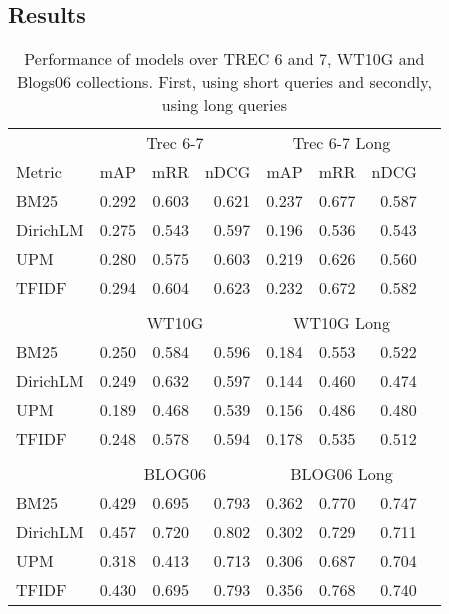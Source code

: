 \subsection{Results}
\begin{table}[h]
  \centering
\begin{tabular*}{\textwidth}{l @{\extracolsep{\fill}}lrrrrrr}
\toprule
& \multicolumn{3}{c}{Trec 6-7} &  \multicolumn{3}{c}{Trec 6-7 Long}\\
\cmidrule(r){2-4}
\cmidrule(r){5-7}
Metric                    & mAP    & mRR    & nDCG  & mAP    & mRR   & nDCG \\
\midrule
BM25		          		 & 0.292  & 0.603  & 0.621  & 0.237  & 0.677  & 0.587 \\
DirichLM                  & 0.275  & 0.543  & 0.597  & 0.196  & 0.536  & 0.543 \\
UPM                       & 0.280  & 0.575  & 0.603  & 0.219  & 0.626  & 0.560 \\
TFIDF                     & 0.294  & 0.604  & 0.623  & 0.232  & 0.672  & 0.582 \\
\\
& \multicolumn{3}{c}{WT10G} &  \multicolumn{3}{c}{WT10G Long}\\
 \cmidrule(r){2-4} \cmidrule(r){5-7}
BM25		          		 & 0.250  & 0.584  & 0.596  & 0.184  & 0.553 & 0.522 \\
DirichLM                  & 0.249  & 0.632  & 0.597  & 0.144  & 0.460 & 0.474 \\
UPM                       & 0.189  & 0.468  & 0.539  & 0.156  & 0.486 & 0.480 \\
TFIDF                     & 0.248  & 0.578  & 0.594  & 0.178  & 0.535 & 0.512 \\
\\
& \multicolumn{3}{c}{BLOG06} &  \multicolumn{3}{c}{BLOG06 Long}\\
 \cmidrule(r){2-4} \cmidrule(r){5-7}
BM25		         		 & 0.429  & 0.695  & 0.793  & 0.362  & 0.770 & 0.747 \\
DirichLM                  & 0.457  & 0.720  & 0.802  & 0.302  & 0.729 & 0.711 \\
UPM                       & 0.318  & 0.413  & 0.713  & 0.306  & 0.687 & 0.704 \\
TFIDF                     & 0.430  & 0.695  & 0.793  & 0.356  & 0.768 & 0.740 \\
\bottomrule
\end{tabular*}
\caption{Performance of models over TREC 6 and 7, WT10G and Blogs06 collections.  First, using short queries and secondly, using long queries}
\label{tab:queries}
\end{table}

